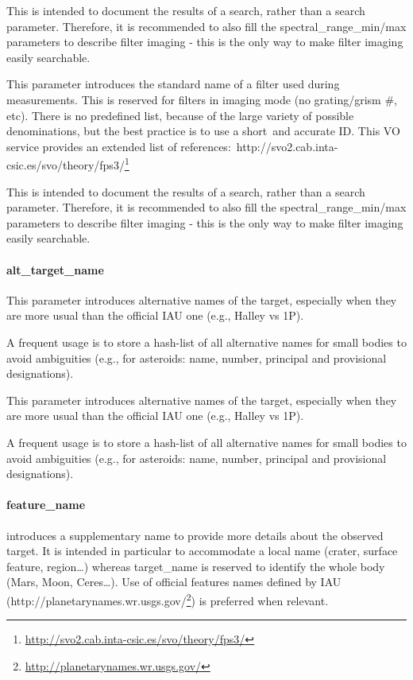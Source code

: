 \documentclass[11pt,a4paper]{ivoa}
\begin{document}
This is intended to document the results of a search, rather than a search parameter. Therefore, it is recommended to also fill the spectral\_range\_min/max parameters to describe filter imaging - this is the only way to make filter imaging easily searchable.

This parameter introduces the standard name of a filter used during measurements. This is reserved for filters in imaging mode (no grating/grism \#, etc). There is no predefined list, because of the large variety of possible denominations, but the best practice is to use a short and accurate ID. This VO service provides an extended list of references: http://svo2.cab.inta-csic.es/svo/theory/fps3/\footnote{\url{http://svo2.cab.inta-csic.es/svo/theory/fps3/}}

This is intended to document the results of a search, rather than a search parameter. Therefore, it is recommended to also fill the spectral\_range\_min/max parameters to describe filter imaging - this is the only way to make filter imaging easily searchable.

\paragraph{alt\_target\_name}

This parameter introduces alternative names of the target, especially when they are more usual than the official IAU one (e.g., Halley vs 1P).

A frequent usage is to store a hash-list of all alternative names for small bodies to avoid ambiguities (e.g., for asteroids: name, number, principal and provisional designations).

This parameter introduces alternative names of the target, especially when they are more usual than the official IAU one (e.g., Halley vs 1P).

A frequent usage is to store a hash-list of all alternative names for small bodies to avoid ambiguities (e.g., for asteroids: name, number, principal and provisional designations).

\paragraph{feature\_name}

introduces a supplementary name to provide more details about the observed target. It is intended in particular to accommodate a local name (crater, surface feature, region…) whereas target\_name is reserved to identify the whole body (Mars, Moon, Ceres…). Use of official features names defined by IAU (http://planetarynames.wr.usgs.gov/\footnote{\url{http://planetarynames.wr.usgs.gov/}}) is preferred when relevant.
\end{document}
